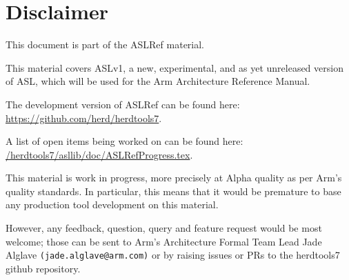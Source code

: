 \chapter{Disclaimer}

This document is part of the ASLRef material.

This material covers ASLv1, a new, experimental, and as yet unreleased version of ASL,
which will be used for the Arm Architecture Reference Manual.

The development version of ASLRef can be found here: \\
\url{https://github.com/herd/herdtools7}.

A list of open items being worked on can be found here: \\
\href{https://github.com/herd/herdtools7//tree/master/asllib/doc/ASLRefProgress.tex}{/herdtools7/asllib/doc/ASLRefProgress.tex}.

This material is work in progress, more precisely at Alpha quality as
per Arm’s quality standards. In particular, this means that it would be
premature to base any production tool development on this material.

However, any feedback, question, query and feature request would be most
welcome; those can be sent to Arm’s Architecture Formal Team Lead Jade Alglave
\texttt{(jade.alglave@arm.com)} or by raising issues or PRs to the herdtools7
github repository.

